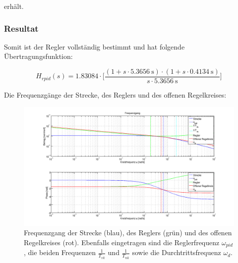 erh\"alt.

\subsubsection{Resultat}

Somit ist der Regler vollst\"andig bestimmt und hat folgende \"Ubertragungsfunktion:

\begin{equation} \label{eq:pid:result}
    H_{rpid}(s) = 1.83084 \cdot \biggl[ \frac{(1 + s \cdot \SI{5.3656}{\second} ) \cdot (1 + s \cdot \SI{0.4134}{\second} ) }{ s \cdot \SI{5.3656}{\second} } \biggr]
\end{equation}

Die Frequenzg\"ange der Strecke, des Reglers und des offenen Regelkreises:

\begin{figure}[h! width=\pagewidth]
    \includegraphics[width=\textwidth]{images/pidCompletePlot.png}
    \caption{%
        Frequenzgang der Strecke (blau), des  Reglers (gr\"un) und des offenen
        Regelkreises  (rot).  Ebenfalls  eingetragen  sind die  Reglerfrequenz
        $\omega_{pid}$,   die   beiden   Frequenzen   $\frac{1}{T_{vk}}$   und
        $\frac{1}{T_{nk}}$ sowie die Durchtrittsfrequenz $\omega_d$.
    }
    \label{fig:pid_complete}
\end{figure}
\clearpage
